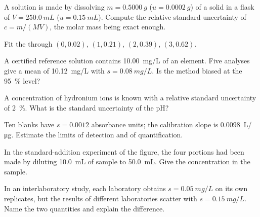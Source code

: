 \begin{exercise}[$\star$]\label{exo:b2:measurement-statistics:3}
A solution is made by dissolving $m = \qty{0.5000}{g}$ ($u = \qty{0.0002}{g}$) of a solid in a flask of
$V = \qty{250.0}{mL}$ ($u = \qty{0.15}{mL}$). Compute the relative standard uncertainty of $c = m/(MV)$,
the molar mass being exact enough.
\end{exercise}

\begin{exercise}[$\star$]\label{exo:b2:measurement-statistics:4}
Fit the  through $(0, 0.02)$, $(1, 0.21)$, $(2, 0.39)$, $(3, 0.62)$.
\end{exercise}

\begin{exercise}[$\star\star$]\label{exo:b2:measurement-statistics:5}
A certified reference solution contains \qty{10.00}{mg/L} of an element. Five analyses give a mean of
\qty{10.12}{mg/L} with $s = \qty{0.08}{mg/L}$. Is the method biased at the 95~\% level?
\end{exercise}

\begin{exercise}[$\star\star$]\label{exo:b2:measurement-statistics:6}
A concentration of hydronium ions is known with a relative standard uncertainty of 2~\%. What is the
standard uncertainty of the pH?
\end{exercise}

\begin{exercise}[$\star\star$]\label{exo:b2:measurement-statistics:7}
Ten blanks have $s = 0.0012$ absorbance units; the calibration slope is \qty{0.0098}{L/\micro g}.
Estimate the limits of detection and of quantification.
\end{exercise}

\begin{exercise}[$\star\star$]\label{exo:b2:measurement-statistics:8}
In the standard-addition experiment of the figure, the four portions had been made by diluting
\qty{10.0}{mL} of sample to \qty{50.0}{mL}. Give the concentration in the sample.
\end{exercise}

\begin{exercise}[$\star\star$]\label{exo:b2:measurement-statistics:9}
In an interlaboratory study, each laboratory obtains $s = \qty{0.05}{mg/L}$ on its own replicates, but
the results of different laboratories scatter with $s = \qty{0.15}{mg/L}$. Name the two quantities and
explain the difference.
\end{exercise}

